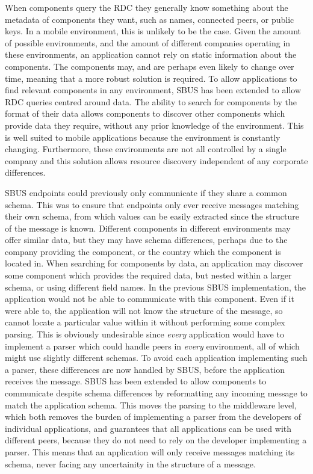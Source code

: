 \documentclass[12pt,twoside,notitlepage]{report}
\begin{document}
When components query the RDC they generally know something about the metadata of components they want, such as names, connected peers, or public keys. 
In a mobile environment, this is unlikely to be the case. 
Given the amount of possible environments, and the amount of different companies operating in these environments, an application cannot rely on static information about the components. 
The components may, and are perhaps even likely to change over time, meaning that a more robust solution is required. 
To allow applications to find relevant components in any environment, SBUS has been extended to allow RDC queries centred around data. 
The ability to search for components by the format of their data allows components to discover other components which provide data they require, without any prior knowledge of the environment. 
This is well suited to mobile applications because the environment is constantly changing. 
Furthermore, these environments are not all controlled by a single company and this solution allows resource discovery independent of any corporate differences. 

SBUS endpoints could previously only communicate if they share a common schema. 
This was to ensure that endpoints only ever receive messages matching their own schema, from which values can be easily extracted since the structure of the message is known. 
Different components in different environments may offer similar data, but they may have schema differences, perhaps due to the company providing the component, or the country which the component is located in. 
When searching for components by data, an application may discover some component which provides the required data, but nested within a larger schema, or using different field names. 
In the previous SBUS implementation, the application would not be able to communicate with this component. 
Even if it were able to, the application will not know the structure of the message, so cannot locate a particular value within it without performing some complex parsing. 
This is obviously undesirable since {\sl every} application would have to implement a parser which could handle peers in {\sl every} environment, all of which might use slightly different schemas.
To avoid each application implementing such a parser, these differences are now handled by SBUS, before the application receives the message. 
SBUS has been extended to allow components to communicate despite schema differences by reformatting any incoming message to match the application schema. 
This moves the parsing to the middleware level, which both removes the burden of implementing a parser from the developers of individual applications, and guarantees that all applications can be used with different peers, because they do not need to rely on the developer implementing a parser. 
This means that an application will only receive messages matching its schema, never facing any uncertainity in the structure of a message. 
\end{document}
